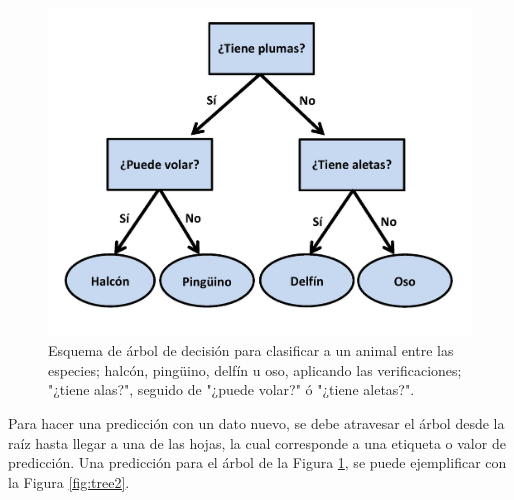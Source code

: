 \begin{figure}[h]
  \centering
  \includegraphics[width=12cm]{figures/image12.jpg}
  \caption[Esquema de árbol de decisión para clasificar animales.]{Esquema de árbol de decisión para clasificar a un animal entre las especies; halcón, pingüino, delfín u oso, aplicando las verificaciones; "¿tiene alas?", seguido de "¿puede volar?" ó "¿tiene aletas?".
  }
  \label{fig:tree1}
\end{figure}

Para hacer una predicción con un dato nuevo, se debe atravesar el árbol desde la raíz hasta llegar a una de las hojas, la cual corresponde a una etiqueta o valor de predicción. Una predicción para el árbol de la Figura \ref{fig:tree1}, se puede ejemplificar con la Figura \ref{fig:tree2}.

